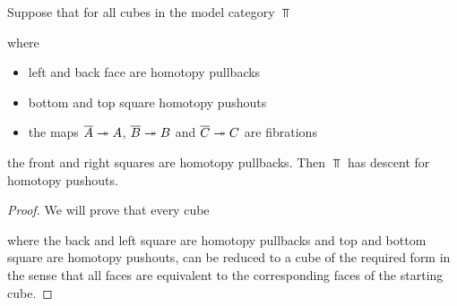 \begin{lemma}\label{lem:reductionStepDescent} %
    Suppose that for all cubes in the model category $\Top$
    \begin{center}
    \end{center}
    where 
    \begin{itemize}
        \item left and back face are homotopy pullbacks
        \item bottom and top square homotopy pushouts 
        \item the maps $\overline{A}\xtwoheadrightarrow{} A$, $\overline{B}\xtwoheadrightarrow{} B$ and $\overline{C}\xtwoheadrightarrow{} C$ are fibrations
    \end{itemize}
    the front and right squares are homotopy pullbacks.
    Then $\Top$ has descent for homotopy pushouts.
    \begin{proof}
        We will prove that every cube
        \begin{center}
        \end{center}
        where the back and left square are homotopy pullbacks and top and bottom square are homotopy pushouts, can be reduced to a cube of the required form in the sense that all faces are equivalent to the corresponding faces of the starting cube.


\end{proof}
\end{lemma}
